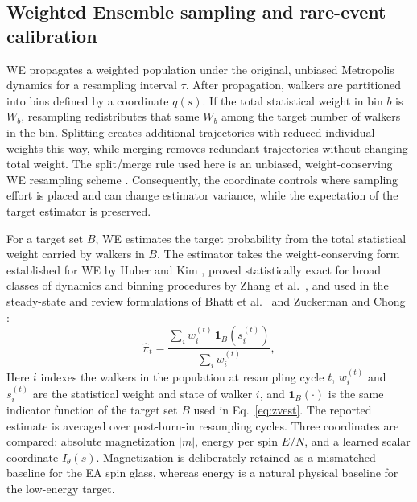 \documentclass[a4paper,fleqn]{cas-sc}
\begin{document}
\subsection{Weighted Ensemble sampling and rare-event calibration}\label{sec:we}
WE propagates a weighted population under the original, unbiased Metropolis dynamics for a
resampling interval $\tau$. After propagation, walkers are partitioned into bins defined by a
coordinate $q(s)$. If the total statistical weight in bin $b$ is $W_b$, resampling
redistributes that same $W_b$ among the target number of walkers in the bin. Splitting creates
additional trajectories with reduced individual weights this way, while merging removes
redundant trajectories without changing total weight. The split/merge rule used here is an unbiased, weight-conserving WE resampling scheme
\citep{zhang2010}. Consequently, the coordinate controls where sampling effort is placed and can
change estimator variance, while the expectation of the target estimator is preserved.

For a target set $B$, WE estimates the target probability from the total statistical weight
carried by walkers in $B$. The estimator takes the weight-conserving form established for WE
by Huber and Kim \citep{huber1996}, proved statistically exact for broad classes of dynamics
and binning procedures by Zhang et al.\ \citep{zhang2010}, and used in the steady-state and
review formulations of Bhatt et al.\ \citep{bhatt2010} and Zuckerman and Chong
\citep{zuckerman2017}:
\begin{equation}
\hat\pi_t=\frac{\sum_i w_i^{(t)}\,\mathbf 1_B\!\left(s_i^{(t)}\right)}{\sum_i w_i^{(t)}},
\label{eq:weest}
\end{equation}
Here $i$ indexes the walkers in the population at resampling cycle $t$, $w_i^{(t)}$ and
$s_i^{(t)}$ are the statistical weight and state of walker $i$, and $\mathbf 1_B(\cdot)$ is the
same indicator function of the target set $B$ used in Eq.~\eqref{eq:zvest}.
The reported estimate is averaged over post-burn-in resampling cycles. Three coordinates
are compared: absolute magnetization $|m|$, energy per spin $E/N$, and a learned scalar
coordinate $I_\theta(s)$. Magnetization is deliberately retained as a mismatched baseline for
the EA spin glass, whereas energy is a natural physical baseline for the low-energy target.
\end{document}
